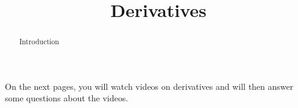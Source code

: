 \documentclass[handout]{ximera}
\title{Derivatives}
\begin{document}
\begin{abstract} Introduction %
\end{abstract}

\maketitle

On the next pages, you will watch videos on derivatives and will then answer some questions about the videos.
\end{document}
